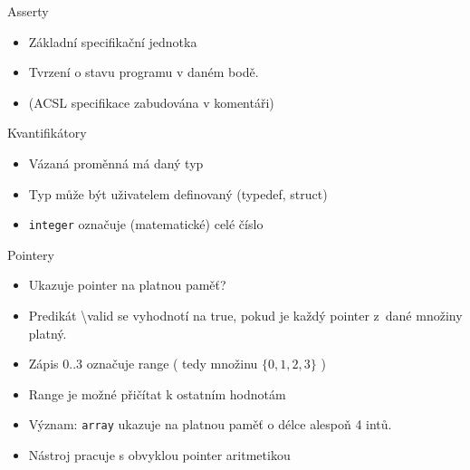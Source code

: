 \documentclass[11pt]{beamer}
\begin{document}
\begin{frame}{Asserty}
\lstBasicAssert
\begin{itemize}
	\item Základní specifikační jednotka
	\item Tvrzení o stavu programu v daném bodě.
	\item (ACSL specifikace zabudována v komentáři)
\end{itemize}
\end{frame}



\begin{frame}{Kvantifikátory}
\lstQuantifiedAssert
\begin{itemize}
	\item Vázaná proměnná má daný typ
	\item Typ může být uživatelem definovaný (typedef, struct)
	\item \texttt{integer} označuje (matematické) celé číslo
\end{itemize}
\end{frame}




\begin{frame}{Pointery}
\lstPointerValidity
\begin{itemize}
	\item Ukazuje pointer na platnou paměť?
	\item Predikát \textbackslash valid se vyhodnotí na true, pokud je každý pointer z~dané množiny platný.
	\pause \item Zápis \( 0..3 \) označuje range ( tedy množinu \( \{ 0, 1, 2, 3 \} \) )
	\pause \item Range je možné přičítat k ostatním hodnotám
	\pause \item Význam: \texttt{array} ukazuje na platnou paměť o délce alespoň 4 intů.
	\pause \item Nástroj pracuje s obvyklou pointer aritmetikou
\end{itemize}
\end{frame}
\end{document}
